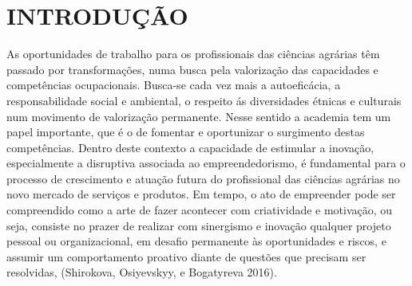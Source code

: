 \chapter{INTRODUÇÃO}

As oportunidades de trabalho para os profissionais das ciências agrárias têm passado por transformações, numa busca pela valorização das capacidades e competências ocupacionais. Busca-se cada vez mais a autoeficácia, a responsabilidade social e ambiental, o respeito ás diversidades étnicas e culturais num movimento de valorização permanente. Nesse sentido a academia tem um papel importante, que é o de fomentar e oportunizar o surgimento destas competências. Dentro deste contexto a capacidade de estimular a inovação, especialmente a disruptiva associada ao empreendedorismo, é fundamental para o processo de crescimento e atuação futura do profissional das ciências agrárias no novo mercado de serviços e produtos. Em tempo, o ato de empreender pode ser compreendido como a arte de fazer acontecer com criatividade e motivação, ou seja, consiste no prazer de realizar com sinergismo e inovação qualquer projeto pessoal ou organizacional, em desafio permanente às oportunidades e riscos, e assumir um comportamento proativo diante de questões que precisam ser resolvidas, (Shirokova, Osiyevskyy, e Bogatyreva 2016).

